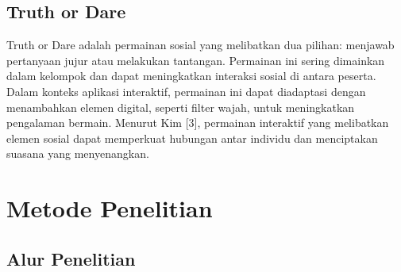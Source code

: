 \documentclass[11pt,a4paper]{article}
\begin{document}
\subsection{Truth or Dare}
Truth or Dare adalah permainan sosial yang melibatkan dua pilihan: menjawab pertanyaan jujur atau melakukan tantangan. Permainan ini sering dimainkan dalam kelompok dan dapat meningkatkan interaksi sosial di antara peserta. Dalam konteks aplikasi interaktif, permainan ini dapat diadaptasi dengan menambahkan elemen digital, seperti filter wajah, untuk meningkatkan pengalaman bermain. Menurut Kim [3], permainan interaktif yang melibatkan elemen sosial dapat memperkuat hubungan antar individu dan menciptakan suasana yang menyenangkan.

\newpage
\section{Metode Penelitian}
\subsection{Alur Penelitian}
\end{document}
